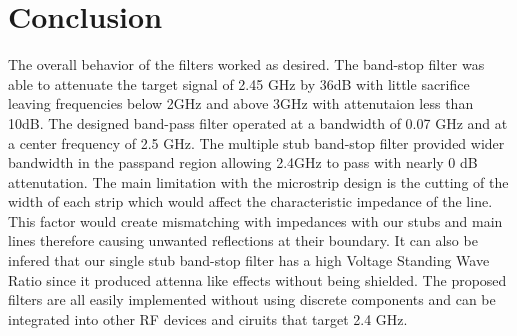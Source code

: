 \documentclass[letterpaper, 11pt, twocolumn]{article}
\begin{document}
\section{Conclusion}
The overall behavior of the filters worked as desired. The band-stop filter was able to attenuate the target signal of 2.45 GHz by 36dB with little sacrifice leaving frequencies below 2GHz and above 3GHz with attenutaion less than 10dB. The designed band-pass filter operated at a bandwidth of 0.07 GHz and at a center frequency of 2.5 GHz. The multiple stub band-stop filter provided wider bandwidth in the passpand region allowing 2.4GHz to pass with nearly 0 dB attenutation. The main limitation with the microstrip design is the cutting of the width of each strip which would affect the characteristic impedance of the line. This factor would create mismatching with impedances with our stubs and main lines therefore causing unwanted reflections at their boundary. It can also be infered that our single stub band-stop filter has a high Voltage Standing Wave Ratio since it produced attenna like effects without being shielded. The proposed filters are all easily implemented without using discrete components and can be integrated into other RF devices and ciruits that target 2.4 GHz.
\end{document}
